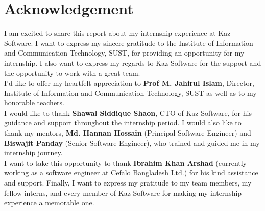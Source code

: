 \chapter*{Acknowledgement}

I am excited to share this report about my internship experience at Kaz Software.
I want to express my sincere gratitude to the Institute of Information and Communication Technology, SUST, for providing an opportunity for my internship.
I also want to express my regards to Kaz Software for the support and the opportunity to work with a great team.\\

I'd like to offer my heartfelt appreciation to \textbf{Prof M. Jahirul Islam}, Director, Institute of Information and Communication Technology, SUST as well as to my honorable teachers.\\

I would like to thank \textbf{Shawal Siddique Shaon}, CTO of Kaz Software, for his guidance and support throughout the internship period.
I would also like to thank my mentors, \textbf{Md. Hannan Hossain} (Principal Software Engineer) and \textbf{Biswajit Panday} (Senior Software Engineer), who trained and guided me in my internship journey.\\

I want to take this opportunity to thank \textbf{Ibrahim Khan Arshad} (currently working as a software engineer at Cefalo Bangladesh Ltd.) for his kind assistance and support.
Finally, I want to express my gratitude to my team members, my fellow interns, and every member of Kaz Software for making my internship experience a memorable one.